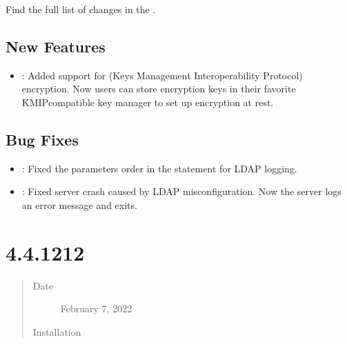 \documentclass[letterpaper,10pt,english]{sphinxmanual}
\begin{document}
\sphinxAtStartPar
Find the full list of changes in the .


\subsection{New Features}
\label{\detokenize{release_notes/4.4.13-13:new-features}}\begin{itemize}
\item {} 
\sphinxAtStartPar
{}: Added support for  (Keys Management Interoperability Protocol) encryption. Now users can store encryption keys in their favorite KMIP\sphinxhyphen{}compatible key manager to set up encryption at rest.

\end{itemize}


\subsection{Bug Fixes}
\label{\detokenize{release_notes/4.4.13-13:bug-fixes}}\begin{itemize}
\item {} 
\sphinxAtStartPar
{}: Fixed the parameters order in the  statement for LDAP logging.

\item {} 
\sphinxAtStartPar
{}: Fixed server crash caused by LDAP misconfiguration. Now the server logs an error message and exits.

\end{itemize}


\section{ 4.4.12\sphinxhyphen{}12}
\label{\detokenize{release_notes/4.4.12-12:percona-server-for-mongodb-4-4-12-12}}\label{\detokenize{release_notes/4.4.12-12:psmdb-4-4-12-12}}\label{\detokenize{release_notes/4.4.12-12::doc}}\begin{quote}\begin{description}
\item[{Date}] \leavevmode
\sphinxAtStartPar
February 7, 2022

\item[{Installation}] \leavevmode
\sphinxAtStartPar
{}

\end{description}\end{quote}
\end{document}

